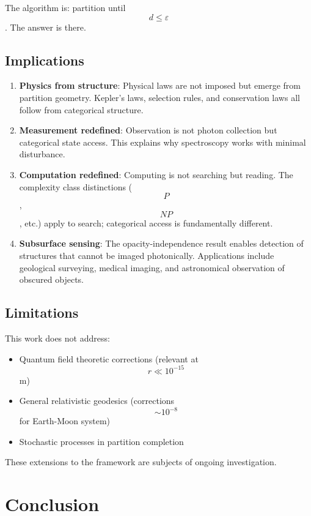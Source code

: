 \documentclass[11pt,twocolumn,a4paper]{article}
\theoremstyle{definition}
\theoremstyle{remark}
\begin{document}
The algorithm is: partition until $$d \leq \varepsilon$$. The answer is there.

\subsection{Implications}

\begin{enumerate}
    \item \textbf{Physics from structure}: Physical laws are not imposed but emerge from partition geometry. Kepler's laws, selection rules, and conservation laws all follow from categorical structure.

    \item \textbf{Measurement redefined}: Observation is not photon collection but categorical state access. This explains why spectroscopy works with minimal disturbance.

    \item \textbf{Computation redefined}: Computing is not searching but reading. The complexity class distinctions ($$P$$, $$NP$$, etc.) apply to search; categorical access is fundamentally different.

    \item \textbf{Subsurface sensing}: The opacity-independence result enables detection of structures that cannot be imaged photonically. Applications include geological surveying, medical imaging, and astronomical observation of obscured objects.
\end{enumerate}

\subsection{Limitations}

This work does not address:
\begin{itemize}
    \item Quantum field theoretic corrections (relevant at $$r \ll 10^{-15}$$ m)
    \item General relativistic geodesics (corrections $$\sim 10^{-8}$$ for Earth-Moon system)
    \item Stochastic processes in partition completion
\end{itemize}

These extensions to the framework are subjects of ongoing investigation.

\section{Conclusion}
\label{sec:conclusion}
\end{document}
